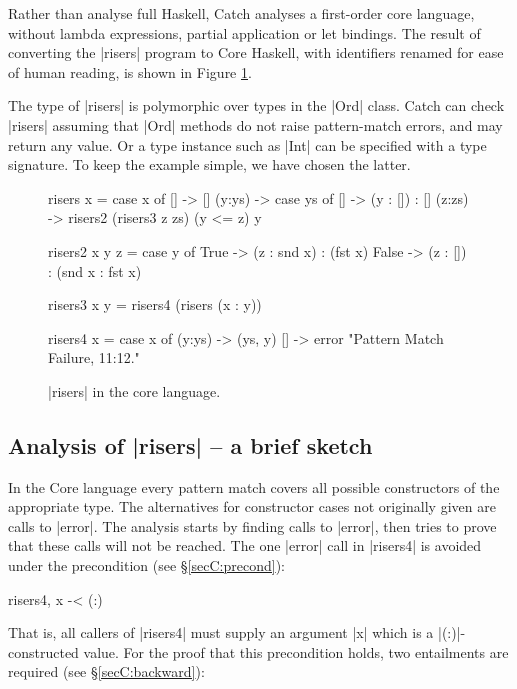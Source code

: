 Rather than analyse full Haskell, Catch analyses a first-order core language, without lambda expressions, partial application or let bindings. The result of converting the |risers| program to Core Haskell, with identifiers renamed for ease of human reading, is shown in Figure \ref{figC:risers_core}.

The type of |risers| is polymorphic over types in the |Ord| class. Catch can check |risers| assuming that |Ord| methods do not raise pattern-match errors, and may return any value. Or a type instance such as |Int| can be specified with a type signature. To keep the example simple, we have chosen the latter.

\begin{figure}
\begin{code}
risers x = case x of
    [] -> []
    (y:ys) ->  case ys of
         [] -> (y : []) : []
         (z:zs) -> risers2 (risers3 z zs) (y <= z) y

risers2 x y z =  case y of
    True -> (z : snd x) : (fst x)
    False -> (z : []) : (snd x : fst x)

risers3 x y = risers4 (risers (x : y))

risers4 x = case x of
    (y:ys) -> (ys, y)
    [] -> error "Pattern Match Failure, 11:12."
\end{code}
\caption{|risers| in the core language.}
\label{figC:risers_core}
\end{figure}

\subsection{Analysis of |risers| -- a brief sketch}

In the Core language every pattern match covers all possible constructors of the appropriate type. The alternatives for constructor cases not originally given are calls to |error|. The analysis starts by finding calls to |error|, then tries to prove that these calls will not be reached. The one |error| call in |risers4| is avoided under the precondition (see \S\ref{secC:precond}):

\ignore\begin{code}
risers4, x -< (:)
\end{code}

\noindent That is, all callers of |risers4| must supply an argument |x| which is a |(:)|-constructed value. For the proof that this precondition holds, two entailments are required (see \S\ref{secC:backward}):


